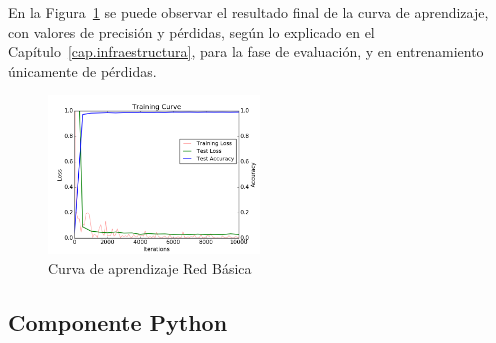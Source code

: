 \begin{description}
	En la Figura~\ref{fig.Log} se puede observar el resultado final de la curva de aprendizaje, con valores de precisión y pérdidas, según lo explicado en el Capítulo~\ref{cap.infraestructura}, para la fase de evaluación, y en entrenamiento únicamente de pérdidas.
	
	\begin{figure}[h!]
		\begin{center}
			\includegraphics[width=0.5\textwidth]{figures/RedBasicaLog}
			\caption{Curva de aprendizaje Red Básica}
			\label{fig.Log}
		\end{center}
	\end{figure}
\end{description}
\subsection{Componente Python}


